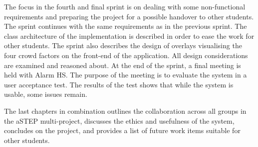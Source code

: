 The focus in the fourth and final sprint is on dealing with some non-functional requirements and preparing the project for a possible handover to other students. The sprint continues with the same requirements as in the previous sprint. The class architecture of the implementation is described in order to ease the work for other students. The sprint also describes the design of overlays visualising the four crowd factors on the front-end of the application. All design considerations are examined and reasoned about. At the end of the sprint, a final meeting is held with Alarm HS. The purpose of the meeting is to evaluate the system in a user acceptance test. The results of the test shows that while the system is usable, some issues remain.

The last chapters in combination outlines the collaboration across all groups in the aSTEP multi-project, discusses the ethics and usefulness of the system, concludes on the project, and provides a list of future work items suitable for other students.